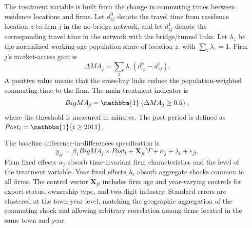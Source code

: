 \documentclass[12pt]{article}
\begin{document}
The treatment variable is built from the change in commuting times between residence locations and firms. Let \(d^0_{zj}\) denote the travel time from residence location \(z\) to firm \(j\) in the no-bridge network, and let \(d^1_{zj}\) denote the corresponding travel time in the network with the bridge/tunnel links. Let \(\lambda_z\) be the normalized working-age population share of location \(z\), with \(\sum_z \lambda_z=1\). Firm \(j\)'s market-access gain is
\begin{equation}
    \Delta MA_j
    =
    \sum_z \lambda_z\left(d^0_{zj}-d^1_{zj}\right).
    \label{eq:empirical_dma}
\end{equation}
A positive value means that the cross-bay links reduce the population-weighted commuting time to the firm. The main treatment indicator is
\begin{equation}
    BigMA_j = \mathbbm{1}\left\{\Delta MA_j \geq 0.5\right\},
    \label{eq:empirical_big_ma}
\end{equation}
where the threshold is measured in minutes. The post period is defined as \(Post_t=\mathbbm{1}\{t \geq 2011\}\).

The baseline difference-in-differences specification is
\begin{equation}
    y_{jt}
    =
    \beta_1 BigMA_j\times Post_t
    + \mathbf{X}_{jt}'\Gamma
    + \alpha_j
    + \lambda_t
    + \varepsilon_{jt}.
    \label{eq:empirical_baseline_did}
\end{equation}
Firm fixed effects \(\alpha_j\) absorb time-invariant firm characteristics and the level of the treatment variable. Year fixed effects \(\lambda_t\) absorb aggregate shocks common to all firms. The control vector \(\mathbf{X}_{jt}\) includes firm age and year-varying controls for export status, ownership type, and two-digit industry. Standard errors are clustered at the town-year level, matching the geographic aggregation of the commuting shock and allowing arbitrary correlation among firms located in the same town and year.
\end{document}
